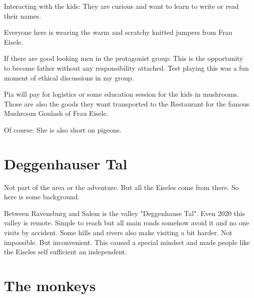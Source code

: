 Interacting with the kids: They are curious and want to learn to write or read their names.

Everyone here is wearing the warm and scratchy knitted jumpers from Frau Eisele.

If there are good looking men in the protagonist group: This is the opportunity to become father without any responsibility attached. Test playing this was a fun moment of ethical discussions in my group.

Pia will pay for logistics or some education session for the kids in mushrooms. Those are also the goods they want transported to the Restaurant for the famous Mushroom Goulash of Frau Eisele.

Of course: She is also short on pigeons.


\section{Deggenhauser Tal}

Not part of the area or the adventure. But all the Eiseles come from there. So here is some background.

Between Ravensburg and Salem is the valley "Deggenhause Tal". Even 2020 this valley is remote. Simple to reach but all main roads somehow avoid it and no one visits by accident. Some hills and rivers also make visiting a bit harder. Not impossible. But inconvenient. This caused a special mindset and made people like the Eiseles self sufficient an independent.


\section{The monkeys}

